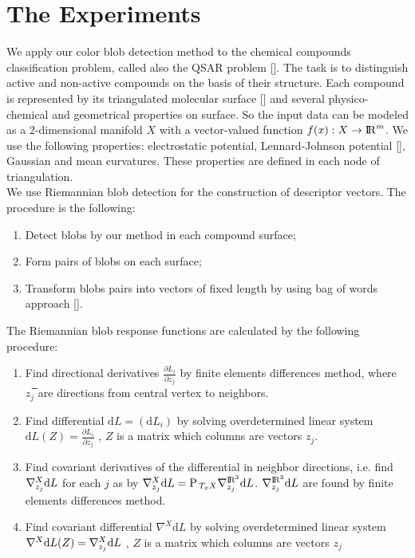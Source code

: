 \documentclass{llncs}
\newcommand{\Proj}{\mathrm{P}{\,}}
\newcommand{\partderiv}[2]{\frac{\partial #1}{\partial #2}}
\newcommand{\CovariantDiffManif}[1]{\nabla^{#1}}
\newcommand{\CovariantDerivManif}[2]{\tensor*{\nabla}{^{#1}_{#2}}}
\newcommand{\Diff}{\mathrm{d}}
\begin{document}
\section{The Experiments}
We apply our color blob detection method to the chemical compounds classification problem, called also the QSAR problem []. The task is to distinguish active and non-active compounds on the basis of their structure. Each compound is represented by its triangulated molecular surface [] and several physico-chemical and geometrical properties on surface. So the input data can be modeled as a 2-dimensional manifold $X$ with a vector-valued function $f(x):X \to {\rm I\!R}^m$. We use the following properties: electrostatic potential, Lennard-Johnson potential [], Gaussian and mean curvatures. These properties are defined in each node of triangulation.
\\
We use Riemannian blob detection for the construction of descriptor vectors. The procedure is the following:
\begin{enumerate} 
\item Detect blobs by our method in each compound surface;
\item	Form pairs of blobs on each surface;
\item Transform blobs pairs into vectors of fixed length by using bag of words approach [].
\end{enumerate}
The Riemannian blob response functions are calculated by the following procedure:
\begin{enumerate} 
	\item Find directional derivatives $\partderiv{L_i}{z_j}$ by finite elements differences method, where $z_j$̅ are directions from central vertex to neighbors. 
	\item Find differential $\Diff L=(\Diff L_i)$ by solving overdetermined linear system $\Diff L(Z)=\partderiv{L_i}{z_j}$ , $Z$  is a matrix which columns are vectors $z_j$.
	\item Find covariant derivatives of the differential in neighbor directions, i.e. find $\CovariantDerivManif{X}{z_j} \Diff L$ for each $j$ as by $\CovariantDerivManif{X}{z_j} \Diff L =\Proj_{T_xX} \CovariantDerivManif{\bbbr^3}{z_j} \Diff L$. $\CovariantDerivManif{\bbbr^3}{z_j} \Diff L$ are found by finite elements differences method.
	\item Find covariant differential $\CovariantDiffManif{X} \Diff L$ by solving overdetermined linear system 
	$\CovariantDiffManif{X} \Diff L(Z)=\CovariantDerivManif{X}{z_j} \Diff L$ , $Z$  is a matrix which columns are vectors $z_j$
	\end{enumerate}
\end{document}
